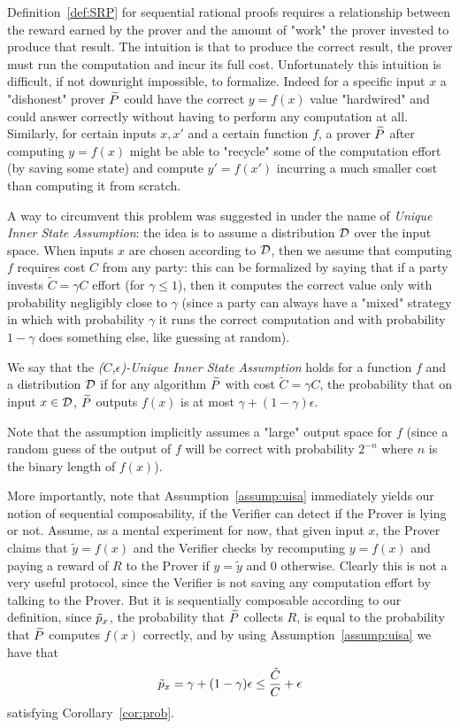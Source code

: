 Definition~\ref{def:SRP} for sequential rational proofs requires a relationship between the reward earned by the prover and the amount of "work" the prover invested to produce that result. The intuition is that to produce the correct result, the prover must run the computation and incur its full cost. Unfortunately 
this intuition is difficult, if not downright impossible, to formalize. Indeed for a specific input $x$ a "dishonest" prover $\widetilde{P}$ could have the correct 
$y=f(x)$ value "hardwired" and could answer correctly without having to perform any computation at all. Similarly, for certain inputs $x,x'$ and a certain 
function $f$, a prover $\widetilde{P}$ after computing $y=f(x)$ might be able to "recycle" some of the computation effort (by saving some state) and compute 
$y'=f(x')$ incurring a much smaller cost than computing it from scratch. 

A way to circumvent this problem was suggested in \cite{b08} under the name of {\em Unique Inner State Assumption}: the idea is to assume a distribution 
$\cal D$ over the input space. When inputs $x$ are chosen according to $\cal D$, then we assume that computing $f$ requires cost $C$ from any party: 
this can be formalized by saying that if a party invests $\tilde{C}=\gamma C$ effort (for $\gamma \leq 1$), then it computes the correct value only with
probability negligibly close to $\gamma$ (since 
a party can always have a "mixed" strategy in which with probability $\gamma$ it runs the correct computation and with probability $1-\gamma$ does 
something else, like guessing at random). 

\begin{myassump}
\label{assump:uisa}
We say that the {\em ($C$,$\epsilon$)-Unique Inner State Assumption} holds for a function $f$ and a distribution $\cal D$ if for any algorithm $\widetilde{P}$ with
cost $\tilde{C}=\gamma C$, the probability that on input $x \in {\cal D}$, $\widetilde{P}$ outputs $f(x)$ is at most $\gamma+(1-\gamma)\epsilon$. 
\end{myassump}

Note that the assumption implicitly assumes a "large" output space for $f$ (since a random guess of the output of $f$ will be correct with probability 
$2^{-n}$ where $n$ is the binary length of $f(x)$). 

More importantly, note that Assumption~\ref{assump:uisa} immediately yields our notion of sequential composability, if the Verifier can detect if the 
Prover is lying or not. Assume, as a mental experiment for now, that given input $x$, the Prover claims that $\tilde{y}=f(x)$ and the Verifier
checks by recomputing $y=f(x)$ and paying a reward of $R$ to the Prover if $y=\tilde{y}$ and $0$ otherwise. Clearly this is not a very useful protocol, 
since the Verifier is not saving any computation effort by talking to the Prover. But it is sequentially composable according to our definition, since 
$\tilde{p}_x$, the probability that $\widetilde{P}$ collects $R$, is equal to the probability that $\widetilde{P}$ computes $f(x)$ correctly, and by using 
Assumption~\ref{assump:uisa} we have that 
$$ \tilde{p}_x = \gamma+(1-\gamma)\epsilon \leq \frac{\tilde{C}}{C} + \epsilon $$
satisfying Corollary~\ref{cor:prob}.

